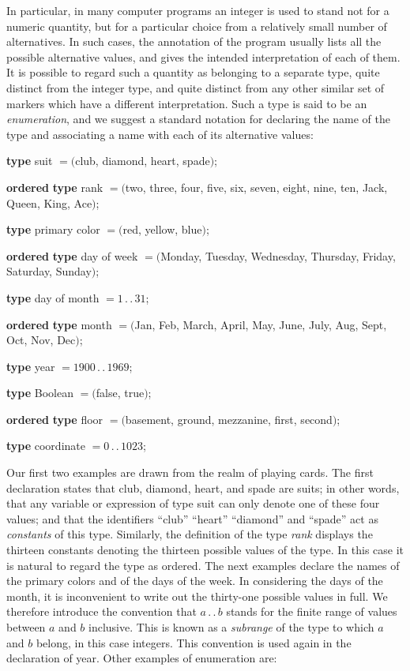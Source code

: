 \documentclass[twoside,11pt]{book}
\begin{document}
In particular, in many computer programs an integer is used to stand not for a numeric quantity, but for a particular choice from a relatively small number of alternatives. In such cases, the annotation of the program usually lists all the possible alternative values, and gives the intended interpretation of each of them. It is possible to regard such a quantity as belonging to a separate type, quite distinct from the integer type, and quite distinct from any other similar set of markers which have a different interpretation. Such a type is said to be an \textit{enumeration}, and we suggest a standard notation for declaring the name of the type and associating a name with each of its alternative values:
\medskip

\tabto{3.7em}\textbf{type} suit $= ($club, diamond, heart, spade$)$;

\noindent
{}\parindent\textbf{ordered} \tabto{3.7em}\textbf{type} rank $= ($two, three, four, five, six, seven, eight, nine, ten, Jack, Queen, King, Ace$)$;
\medskip

\tabto{3.7em}\textbf{type} primary color $= ($red, yellow, blue$)$;

\noindent
{}\parindent\textbf{ordered} \tabto{3.7em}\textbf{type} day of week $= ($Monday, Tuesday, Wednesday, Thursday, Friday, Saturday, Sunday$)$;
\medskip

\tabto{3.7em}\textbf{type} day of month $= 1\,.\,.\,31$;

\noindent
{}\parindent\textbf{ordered} \tabto{3.7em}\textbf{type} month $= ($Jan, Feb, March, April, May, June, July, Aug, Sept, Oct, Nov, Dec$)$;
\medskip

\tabto{3.7em}\textbf{type} year $= 1900\,.\,.\,1969$;

\tabto{3.7em}\textbf{type} Boolean $= ($false, true$)$;
\medskip

\noindent
{}\parindent\textbf{ordered} \tabto{3.7em}\textbf{type} floor $= ($basement, ground, mezzanine, first, second$)$;

\tabto{3.7em}\textbf{type} coordinate $= 0\,.\,.\,1023$;
\medskip

Our first two examples are drawn from the realm of playing cards. The first declaration states that club, diamond, heart, and spade are suits; in other words, that any variable or expression of type suit can only denote one of these four values; and that the identifiers ``club'' ``heart'' ``diamond'' and ``spade'' act as \textit{constants} of this type. Similarly, the definition of the type \textit{rank} displays the thirteen constants denoting the thirteen possible values of the type. In this case it is natural to regard the type as ordered. The next examples declare the names of the primary colors and of the days of the week. In considering the days of the month, it is inconvenient to write out the thirty-one possible values in full. We therefore introduce the convention that $a\,.\,.\,b$ stands for the finite range of values between $a$ and $b$ inclusive. This is known as a \textit{subrange} of the type to which $a$ and $b$ belong, in this case integers. This convention is used again in the declaration of year. Other examples of enumeration are:
\end{document}

